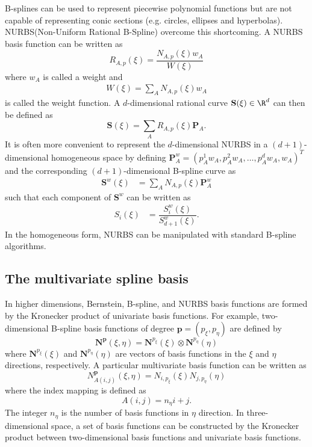 B-splines can be used to represent piecewise polynomial functions but are not capable of representing conic sections (e.g. circles, ellipses and hyperbolas). NURBS(Non-Uniform Rational B-Spline) overcome this shortcoming.  A NURBS basis function can be written as
\begin{equation}
    R_{A,p}(\xi)=\dfrac{N_{A,p}(\xi)w_A}{W{(\xi)}}
\end{equation}
where $w_A$ is called a weight and
\begin{align}
    \label{eq:weight}
    W(\xi)=\sum_{A} N_{A,p}(\xi)w_A
\end{align}
is called the weight function. A $d$-dimensional rational curve $\mathbf{S}(\xi)\in{\R^d}$ can then be defined as
\begin{equation}
    \mathbf{S}(\xi)=\sum_A R_{A,p}(\xi)\mathbf{P}_A.
\end{equation}
It is often more convenient to represent the $d$-dimensional NURBS in a $(d+1)$-dimensional homogeneous space by defining $\mathbf{P}_A^w=(p_A^1w_A,p_A^2w_A,\ldots,p_A^dw_A,w_A)^T$ and the corresponding $(d+1)$-dimensional B-spline curve as
\begin{align}
    \mathbf{S}^w(\xi) & =\sum_A N_{A,p}(\xi)\mathbf{P}_A^w
\end{align}
such that each component of $\mathbf{S}^w$ can be written as
\begin{align}
    S_i(\xi) & =\dfrac{{S}_i^w(\xi)}{{S}_{d+1}^w(\xi)}.
\end{align}
In the homogeneous form, NURBS can be manipulated with standard B-spline algorithms.

\subsection{The multivariate spline basis}

In higher dimensions, Bernstein, B-spline, and NURBS basis functions are formed by the Kronecker product of univariate basis functions. For example, two-dimensional B-spline basis functions of degree $\mathbf{p}=(p_\xi, p_\eta)$ are defined by
\begin{equation}
    \mathbf{N}^\mathbf{p}(\xi,\eta)=\mathbf{N}^{p_\xi}(\xi)\otimes\mathbf{N}^{p_\eta}(\eta)
\end{equation}
where $\mathbf{N}^{p_\xi}(\xi)$ and $\mathbf{N}^{p_\eta}(\eta)$ are vectors of basis functions in the $\xi$ and $\eta$ directions, respectively. A particular multivariate basis function can be written as
\begin{equation}
    {N}_{A(i,j)}^\mathbf{p}(\xi,\eta)={N}_{i,p_\xi}(\xi){N}_{j,p_\eta}(\eta)
\end{equation}
where the index mapping is defined as
\begin{equation}
    A(i,j)=n_\eta{i}+j.
\end{equation}
The integer $n_\eta$ is the number of basis functions in $\eta$ direction. In three-dimensional space, a set of basis functions can be constructed by the Kronecker product between two-dimensional basis functions and univariate basis functions.

